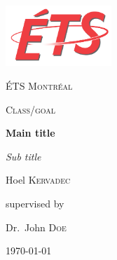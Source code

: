 \begin{titlepage}
    \centering
    \includegraphics[width=0.3\textwidth]{figure/ets_logo}\par\vspace{1cm}
    {\scshape\LARGE ÉTS Montréal\par}
    \vspace{1cm}
    {\scshape\Large Class/goal\par}
    \vspace{1.5cm}
    {\huge\bfseries Main title\par}
    {\Large\itshape Sub title\par}
    \vspace{2cm}
    {\Large Hoel \textsc{Kervadec}\par}
    \vfill
    supervised by\par
    Dr.~John \textsc{Doe}

    \vfill

    {\large \today\par}
\end{titlepage}